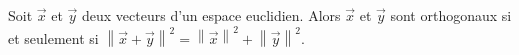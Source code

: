 Soit $\vec x$ et $\vec y$ deux vecteurs d'un espace euclidien. Alors $\vec x$ et $\vec y$ sont orthogonaux si et seulement si $\left\|\vec x+ \vec y\right\|^2=\left\|\vec x\right\|^2+\left\|\vec y\right\|^2$.

\begin{reponses}
\end{reponses}

